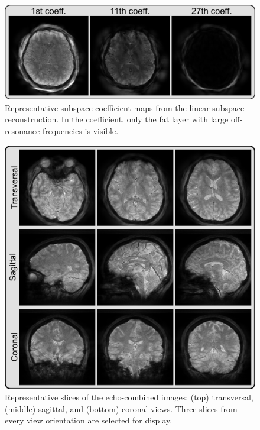 \documentclass[a4paper,11pt]{article}
\def\InternRev{}
\begin{document}
\begin{figure}[H]
	\centering
\ifdefined\InternRev
	\includegraphics[width=\textwidth]{../figures/fig2.png}
\fi
	\caption{Representative subspace coefficient maps
		from the linear subspace reconstruction.
		In the  coefficient,
		only the fat layer with large off-resonance frequencies is visible.}
	\label{FIG:BasisCoef}
\end{figure}

\ifdefined\InternRev
\pagebreak
\fi

\begin{figure}[H]
	\centering
\ifdefined\InternRev
	\includegraphics[width=\textwidth]{../figures/fig3.png}
\fi
	\caption{Representative slices of the echo-combined images:
		(top) transversal, (middle) sagittal, and (bottom) coronal views.
		Three slices from every view orientation are selected for display.}
	\label{FIG:3DBrain}
\end{figure}
\end{document}
